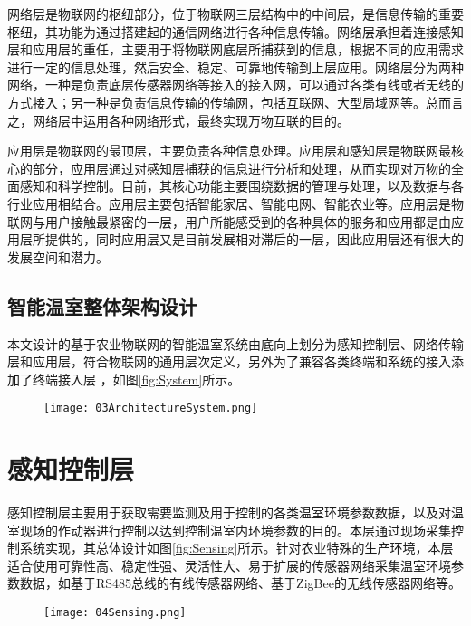 网络层是物联网的枢纽部分，位于物联网三层结构中的中间层，是信息传输的重要枢纽，其功能为通过搭建起的通信网络进行各种信息传输。网络层承担着连接感知层和应用层的重任，主要用于将物联网底层所捕获到的信息，根据不同的应用需求进行一定的信息处理，然后安全、稳定、可靠地传输到上层应用。网络层分为两种网络，一种是负责底层传感器网络等接入的接入网，可以通过各类有线或者无线的方式接入；另一种是负责信息传输的传输网，包括互联网、大型局域网等。总而言之，网络层中运用各种网络形式，最终实现万物互联的目的。

应用层是物联网的最顶层，主要负责各种信息处理\supercite{DengMiwen2015}。应用层和感知层是物联网最核心的部分，应用层通过对感知层捕获的信息进行分析和处理，从而实现对万物的全面感知和科学控制。目前，其核心功能主要围绕数据的管理与处理，以及数据与各行业应用相结合。应用层主要包括智能家居、智能电网、智能农业等。应用层是物联网与用户接触最紧密的一层，用户所能感受到的各种具体的服务和应用都是由应用层所提供的，同时应用层又是目前发展相对滞后的一层，因此应用层还有很大的发展空间和潜力。

	
	\subsection{智能温室整体架构设计}
本文设计的基于农业物联网的智能温室系统由底向上划分为感知控制层、网络传输层和应用层，符合物联网的通用层次定义，另外为了兼容各类终端和系统的接入添加了终端接入层\supercite{WangHuaiyu2015} ，如图\ref{fig:System}所示。

	\begin{figure}[!htbp]
		\centering
		\texttt{[image: 03ArchitectureSystem.png]}
	\end{figure}	
\section{感知控制层}
感知控制层主要用于获取需要监测及用于控制的各类温室环境参数数据，以及对温室现场的作动器进行控制以达到控制温室内环境参数的目的。本层通过现场采集控制系统实现，其总体设计如图\ref{fig:Sensing}所示。针对农业特殊的生产环境，本层适合使用可靠性高、稳定性强、灵活性大、易于扩展的传感器网络采集温室环境参数数据，如基于RS485总线的有线传感器网络、基于ZigBee的无线传感器网络等。

	\begin{figure}[!htbp]
		\centering
		\texttt{[image: 04Sensing.png]}
	\end{figure}

